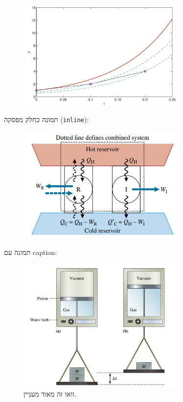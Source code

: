 \documentclass[
  a4paper,
]{article}
\begin{document}
\begin{figure}
\centering
\includegraphics[width=0.75\textwidth,height=0.4\textheight]{NUM1/NUM1_011/Screenshot_20240322_182502_OneDrive.jpg}
\caption{}
\end{figure}

תמונה כחלק מפסקה (\texttt{inline}):

\begin{figure}
\centering
\includegraphics[width=0.75\textwidth,height=0.4\textheight]{THE1/THE1_005/Pasted image 20240223092520.png}
\caption{}
\end{figure}

תמונה עם caption:

\begin{figure}
\centering
\includegraphics[width=0.75\textwidth,height=0.4\textheight]{GCH1/GCH1_004/Screenshot_20230127_102808_Microsoft 365 (Office).jpg}
\caption{וואו זה מאוד מעניין.}
\end{figure}
\end{document}
